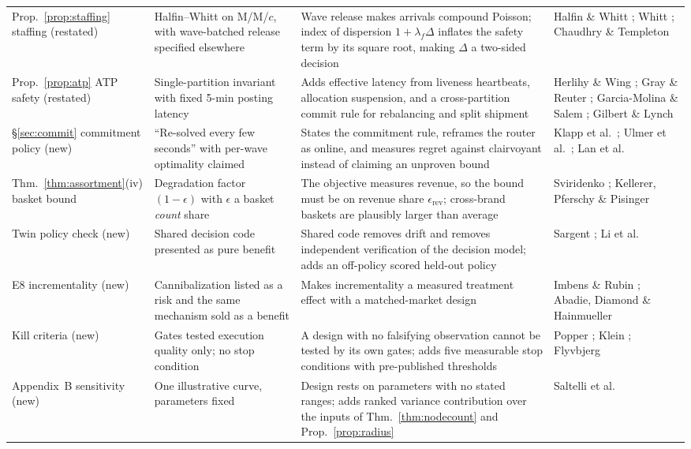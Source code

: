 \documentclass[10pt,twocolumn,letterpaper]{article}
\theoremstyle{definition}
\begin{document}
\begin{table}[t]
\begin{tabular}{@{}p{2.5cm}p{5.4cm}p{5.4cm}p{3.0cm}@{}}
Prop.~\ref{prop:staffing} staffing (restated) & Halfin--Whitt on M/M/$c$, with wave-batched release specified elsewhere & Wave release makes arrivals compound Poisson; index of dispersion $1+\lambda_f\Delta$ inflates the safety term by its square root, making $\Delta$ a two-sided decision & Halfin \& Whitt \cite{halfin1981}; Whitt \cite{whitt1993,whitt2004}; Chaudhry \& Templeton \cite{chaudhry1983}\\
Prop.~\ref{prop:atp} ATP safety (restated) & Single-partition invariant with fixed 5-min posting latency & Adds effective latency from liveness heartbeats, allocation suspension, and a cross-partition commit rule for rebalancing and split shipment & Herlihy \& Wing \cite{herlihy1990}; Gray \& Reuter \cite{gray1993}; Garcia-Molina \& Salem \cite{garciamolina1987}; Gilbert \& Lynch \cite{gilbert2002}\\
\S\ref{sec:commit} commitment policy (new) & ``Re-solved every few seconds'' with per-wave optimality claimed & States the commitment rule, reframes the router as online, and measures regret against clairvoyant instead of claiming an unproven bound & Klapp et al.\ \cite{klapp2018}; Ulmer et al.\ \cite{ulmer2021}; Lan et al.\ \cite{lan2024}\\
Thm.~\ref{thm:assortment}(iv) basket bound & Degradation factor $(1-\epsilon)$ with $\epsilon$ a basket \emph{count} share & The objective measures revenue, so the bound must be on revenue share $\epsilon_{\mathrm{rev}}$; cross-brand baskets are plausibly larger than average & Sviridenko \cite{sviridenko2004}; Kellerer, Pferschy \& Pisinger \cite{kellerer2004}\\
Twin policy check (new) & Shared decision code presented as pure benefit & Shared code removes drift and removes independent verification of the decision model; adds an off-policy scored held-out policy & Sargent \cite{sargent2013}; Li et al.\ \cite{li2011}\\
E8 incrementality (new) & Cannibalization listed as a risk and the same mechanism sold as a benefit & Makes incrementality a measured treatment effect with a matched-market design & Imbens \& Rubin \cite{imbens2015}; Abadie, Diamond \& Hainmueller \cite{abadie2010}\\
Kill criteria (new) & Gates tested execution quality only; no stop condition & A design with no falsifying observation cannot be tested by its own gates; adds five measurable stop conditions with pre-published thresholds & Popper \cite{popper1959}; Klein \cite{klein2007}; Flyvbjerg \cite{flyvbjerg2006}\\
Appendix~B sensitivity (new) & One illustrative curve, parameters fixed & Design rests on parameters with no stated ranges; adds ranked variance contribution over the inputs of Thm.~\ref{thm:nodecount} and Prop.~\ref{prop:radius} & Saltelli et al.\ \cite{saltelli2008}\\
\bottomrule
\end{tabular}
\end{table}
\end{document}
